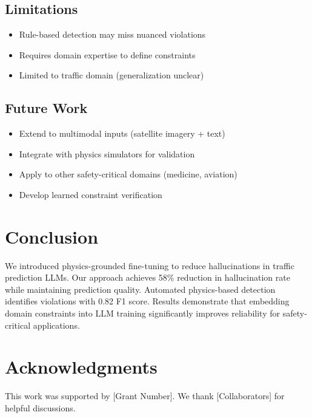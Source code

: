 \documentclass[conference]{IEEEtran}
\begin{document}
\subsection{Limitations}

\begin{itemize}
    \item Rule-based detection may miss nuanced violations
    \item Requires domain expertise to define constraints
    \item Limited to traffic domain (generalization unclear)
\end{itemize}

\subsection{Future Work}

\begin{itemize}
    \item Extend to multimodal inputs (satellite imagery + text)
    \item Integrate with physics simulators for validation
    \item Apply to other safety-critical domains (medicine, aviation)
    \item Develop learned constraint verification
\end{itemize}

\section{Conclusion}

We introduced physics-grounded fine-tuning to reduce hallucinations in traffic prediction LLMs. Our approach achieves 58\% reduction in hallucination rate while maintaining prediction quality. Automated physics-based detection identifies violations with 0.82 F1 score. Results demonstrate that embedding domain constraints into LLM training significantly improves reliability for safety-critical applications.

\section*{Acknowledgments}
This work was supported by [Grant Number]. We thank [Collaborators] for helpful discussions.
\end{document}
